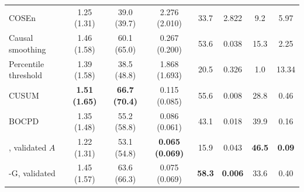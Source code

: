 \begin{table}[!htbp]
{\begin{tabular}{@{}>{\raggedright\arraybackslash}p{4.3cm}ccccccc@{}}
\midrule
COSEn & 1.25 (1.31) & 39.0 (39.7) & 2.276 (2.010) & 33.7 & 2.822 & 9.2 & 5.97\\
Causal smoothing & 1.46 (1.58) & 60.1 (65.0) & 0.267 (0.200) & 53.6 & 0.038 & 15.3 & 2.25\\
Percentile threshold & 1.39 (1.58) & 38.5 (48.8) & 1.868 (1.693) & 20.5 & 0.326 & 1.0 & 13.34\\
CUSUM & \textbf{1.51 (1.65)} & \textbf{66.7 (70.4)} & 0.115 (0.085) & 55.6 & 0.008 & 28.8 & 0.46\\
BOCPD & 1.35 (1.48) & 55.2 (58.8) & 0.086 (0.061) & 43.1 & 0.018 & 39.9 & 0.16\\
\method{}, validated $A$ & 1.22 (1.31) & 53.1 (54.8) & \textbf{0.065 (0.069)} & 15.9 & 0.043 & \textbf{46.5} & \textbf{0.09}\\
\method{}-G, validated & 1.45 (1.57) & 63.6 (66.3) & 0.075 (0.069) & \textbf{58.3} & \textbf{0.006} & 33.6 & 0.40\\
\bottomrule
\end{tabular}}
\end{table}
